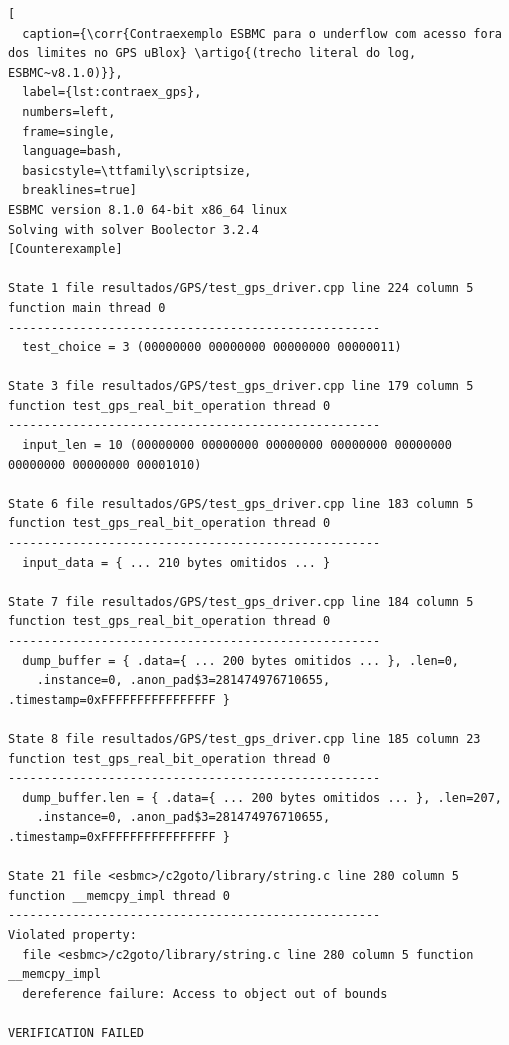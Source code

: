 \begin{lstlisting}[
  caption={\corr{Contraexemplo ESBMC para o underflow com acesso fora dos limites no GPS uBlox} \artigo{(trecho literal do log, ESBMC~v8.1.0)}},
  label={lst:contraex_gps},
  numbers=left,
  frame=single,
  language=bash,
  basicstyle=\ttfamily\scriptsize,
  breaklines=true]
ESBMC version 8.1.0 64-bit x86_64 linux
Solving with solver Boolector 3.2.4
[Counterexample]

State 1 file resultados/GPS/test_gps_driver.cpp line 224 column 5 function main thread 0
----------------------------------------------------
  test_choice = 3 (00000000 00000000 00000000 00000011)

State 3 file resultados/GPS/test_gps_driver.cpp line 179 column 5 function test_gps_real_bit_operation thread 0
----------------------------------------------------
  input_len = 10 (00000000 00000000 00000000 00000000 00000000 00000000 00000000 00001010)

State 6 file resultados/GPS/test_gps_driver.cpp line 183 column 5 function test_gps_real_bit_operation thread 0
----------------------------------------------------
  input_data = { ... 210 bytes omitidos ... }

State 7 file resultados/GPS/test_gps_driver.cpp line 184 column 5 function test_gps_real_bit_operation thread 0
----------------------------------------------------
  dump_buffer = { .data={ ... 200 bytes omitidos ... }, .len=0,
    .instance=0, .anon_pad$3=281474976710655, .timestamp=0xFFFFFFFFFFFFFFFF }

State 8 file resultados/GPS/test_gps_driver.cpp line 185 column 23 function test_gps_real_bit_operation thread 0
----------------------------------------------------
  dump_buffer.len = { .data={ ... 200 bytes omitidos ... }, .len=207,
    .instance=0, .anon_pad$3=281474976710655, .timestamp=0xFFFFFFFFFFFFFFFF }

State 21 file <esbmc>/c2goto/library/string.c line 280 column 5 function __memcpy_impl thread 0
----------------------------------------------------
Violated property:
  file <esbmc>/c2goto/library/string.c line 280 column 5 function __memcpy_impl
  dereference failure: Access to object out of bounds

VERIFICATION FAILED
\end{lstlisting}

  

